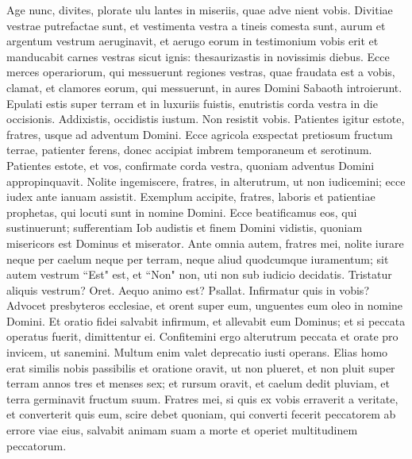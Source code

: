 \begin{biblechapter} 
\verse Age nunc, divites, plorate ulu lantes in miseriis, quae adve nient vobis. 
\verse Divitiae vestrae putrefactae sunt, et vestimenta vestra a tineis comesta sunt, 
\verse aurum et argentum vestrum aeruginavit, et aerugo eorum in testimonium vobis erit et manducabit carnes vestras sicut ignis: thesaurizastis in novissimis diebus. 
\verse Ecce merces operariorum, qui messuerunt regiones vestras, quae fraudata est a vobis, clamat, et clamores eorum, qui messuerunt, in aures Domini Sabaoth introierunt. 
\verse Epulati estis super terram et in luxuriis fuistis, enutristis corda vestra in die occisionis. 
\verse Addixistis, occidistis iustum. Non resistit vobis. 
\verse Patientes igitur estote, fratres, usque ad adventum Domini. Ecce agricola exspectat pretiosum fructum terrae, patienter ferens, donec accipiat imbrem temporaneum et serotinum. 
\verse Patientes estote, et vos, confirmate corda vestra, quoniam adventus Domini appropinquavit. 
\verse Nolite ingemiscere, fratres, in alterutrum, ut non iudicemini; ecce iudex ante ianuam assistit.  
\verse Exemplum accipite, fratres, laboris et patientiae prophetas, qui locuti sunt in nomine Domini. 
\verse Ecce beatificamus eos, qui sustinuerunt; sufferentiam Iob audistis et finem Domini vidistis, quoniam misericors est Dominus et miserator. 
\verse Ante omnia autem, fratres mei, nolite iurare neque per caelum neque per terram, neque aliud quodcumque iuramentum; sit autem vestrum “Est" est, et “Non" non, uti non sub iudicio decidatis. 
\verse Tristatur aliquis vestrum? Oret. Aequo animo est? Psallat. 
\verse Infirmatur quis in vobis? Advocet presbyteros ecclesiae, et orent super eum, unguentes eum oleo in nomine Domini. 
\verse Et oratio fidei salvabit infirmum, et allevabit eum Dominus; et si peccata operatus fuerit, dimittentur ei. 
\verse Confitemini ergo alterutrum peccata et orate pro invicem, ut sanemini. Multum enim valet deprecatio iusti operans. 
\verse Elias homo erat similis nobis passibilis et oratione oravit, ut non plueret, et non pluit super terram annos tres et menses sex; 
\verse et rursum oravit, et caelum dedit pluviam, et terra germinavit fructum suum. 
\verse Fratres mei, si quis ex vobis erraverit a veritate, et converterit quis eum, 
\verse scire debet quoniam, qui converti fecerit peccatorem ab errore viae eius, salvabit animam suam a morte et operiet multitudinem peccatorum.
\end{biblechapter}
